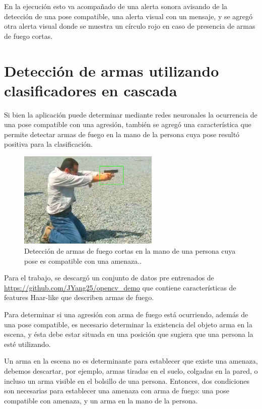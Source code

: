 \documentclass[a4paper,12pt,oneside,spanish]{book}
\begin{document}
En la ejecución esto va acompañado de una alerta sonora avisando de la detección de una pose compatible, una alerta visual con un mensaje, y se agregó otra alerta visual donde se muestra un círculo rojo en caso de presencia de armas de fuego cortas.\par

\section{Detección de armas utilizando clasificadores en cascada}\label{deteccionarmas}
Si bien la aplicación puede determinar mediante redes neuronales la ocurrencia de una pose compatible con una agresión, también se agregó una característica que permite detectar armas de fuego en la mano de la persona cuya pose resultó positiva para la clasificación.\par

\begin{figure}[h!]
	\includegraphics[width=190pt]{Imagenes/output2.jpg}
	\centering	
	\caption{Detección de armas de fuego cortas en la mano de una persona cuya pose es compatible con una amenaza..}
	\label{fig:output2}
\end{figure}

Para el trabajo, se descargó un conjunto de datos pre entrenados de \url{https://github.com/JYang25/opencv_demo} que contiene características de features Haar-like que describen armas de fuego.\par

Para determinar si una agresión con arma de fuego está ocurriendo, además de una pose compatible, es necesario determinar la existencia del objeto arma en la escena, y ésta debe estar situada en una posición que sugiera que una persona la esté utilizando. \par

Un arma en la escena no es determinante para establecer que existe una amenaza, debemos descartar, por ejemplo, armas tiradas en el suelo, colgadas en la pared, o incluso un arma visible en el bolsillo de una persona. Entonces, dos condiciones son necesarias para establecer una amenaza con arma de fuego: una pose compatible con amenaza, y un arma en la mano de la persona.\par
\end{document}
